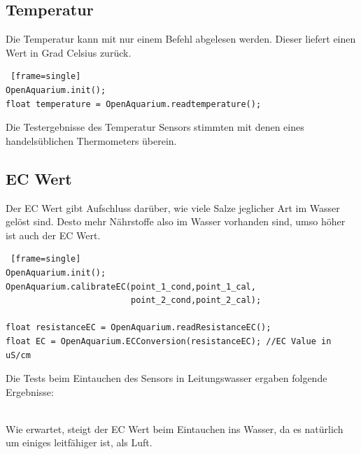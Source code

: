 \documentclass[11pt]{article}
\begin{document}
\subsection{Temperatur}
Die Temperatur kann mit nur einem Befehl abgelesen werden. Dieser liefert einen Wert in Grad Celsius zur\"uck.
\begin{lstlisting} [frame=single]
OpenAquarium.init();
float temperature = OpenAquarium.readtemperature();
\end{lstlisting}
Die Testergebnisse des Temperatur Sensors stimmten mit denen eines handels\"ublichen Thermometers \"uberein.

\subsection{EC Wert}
Der EC Wert gibt Aufschluss dar\"uber, wie viele Salze jeglicher Art im Wasser gel\"ost sind. Desto mehr N\"ahrstoffe also im Wasser vorhanden sind, umso h\"oher ist auch der EC Wert.

\begin{lstlisting} [frame=single]
OpenAquarium.init();
OpenAquarium.calibrateEC(point_1_cond,point_1_cal,
                         point_2_cond,point_2_cal);

float resistanceEC = OpenAquarium.readResistanceEC();
float EC = OpenAquarium.ECConversion(resistanceEC); //EC Value in uS/cm
\end{lstlisting}
Die Tests beim Eintauchen des Sensors in Leitungswasser ergaben folgende Ergebnisse: \\ \\
\begin{minipage}{5in}
  \centering
\end{minipage}
\vskip0.5cm
Wie erwartet, steigt der EC Wert beim Eintauchen ins Wasser, da es nat\"urlich um einiges leitf\"ahiger ist, als Luft.
\end{document}
